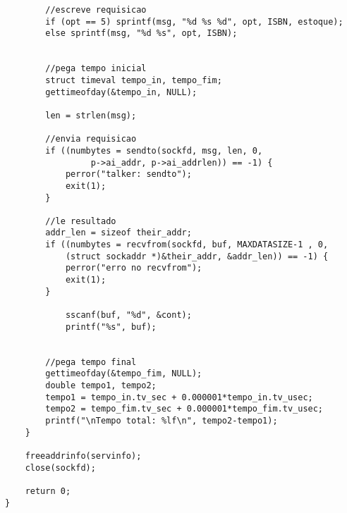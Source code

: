 \documentclass[11pt, brazil]{article} %
\begin{document}
\begin{verbatim}
		//escreve requisicao
		if (opt == 5) sprintf(msg, "%d %s %d", opt, ISBN, estoque);
		else sprintf(msg, "%d %s", opt, ISBN);  
		
		
		//pega tempo inicial
		struct timeval tempo_in, tempo_fim;
		gettimeofday(&tempo_in, NULL);
		
		len = strlen(msg);
		
		//envia requisicao
		if ((numbytes = sendto(sockfd, msg, len, 0,
		         p->ai_addr, p->ai_addrlen)) == -1) {
		    perror("talker: sendto");
		    exit(1);
		}
	
		//le resultado
		addr_len = sizeof their_addr;
		if ((numbytes = recvfrom(sockfd, buf, MAXDATASIZE-1 , 0,
	        (struct sockaddr *)&their_addr, &addr_len)) == -1) {
       		perror("erro no recvfrom");
       		exit(1);
   		}
   		
	        sscanf(buf, "%d", &cont);    		    
	        printf("%s", buf);

		
		//pega tempo final
		gettimeofday(&tempo_fim, NULL);
		double tempo1, tempo2;
		tempo1 = tempo_in.tv_sec + 0.000001*tempo_in.tv_usec;
		tempo2 = tempo_fim.tv_sec + 0.000001*tempo_fim.tv_usec;
		printf("\nTempo total: %lf\n", tempo2-tempo1);
	}

    freeaddrinfo(servinfo);
    close(sockfd);

    return 0;
}
\end{verbatim}
\end{document}
